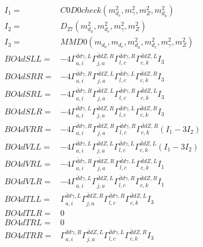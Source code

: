 \documentclass[A4,landscape]{article}
\begin{document}
\begin{align} 
I_1 = & C0D0check(m^2_{d_{{c}}}, m^2_{\gamma}, m^2_{Z}, m^2_{d_{{a}}}) \\ 
I_2 = & D_{27}(m^2_{d_{{a}}}, m^2_{d_{{c}}}, m^2_{\gamma}, m^2_{Z}) \\ 
I_3 = & MMD0(m_{d_{{a}}}, m_{d_{{c}}}, m^2_{d_{{a}}}, m^2_{d_{{c}}}, m^2_{\gamma}, m^2_{Z}) \\ 
  BO4dSLL= & -4  \Gamma^{\bar{d}d \gamma ,L}_{a, i} \Gamma^{\bar{d}d Z ,R}_{j, a} \Gamma^{\bar{d}d \gamma ,R}_{l, c} \Gamma^{\bar{d}d Z ,L}_{c, k} I_3 \\ 
  BO4dSRR= & -4  \Gamma^{\bar{d}d \gamma ,R}_{a, i} \Gamma^{\bar{d}d Z ,L}_{j, a} \Gamma^{\bar{d}d \gamma ,L}_{l, c} \Gamma^{\bar{d}d Z ,R}_{c, k} I_3 \\ 
  BO4dSRL= & -4  \Gamma^{\bar{d}d \gamma ,R}_{a, i} \Gamma^{\bar{d}d Z ,L}_{j, a} \Gamma^{\bar{d}d \gamma ,R}_{l, c} \Gamma^{\bar{d}d Z ,L}_{c, k} I_3 \\ 
  BO4dSLR= & -4  \Gamma^{\bar{d}d \gamma ,L}_{a, i} \Gamma^{\bar{d}d Z ,R}_{j, a} \Gamma^{\bar{d}d \gamma ,L}_{l, c} \Gamma^{\bar{d}d Z ,R}_{c, k} I_3 \\ 
  BO4dVRR= & -4  \Gamma^{\bar{d}d \gamma ,R}_{a, i} \Gamma^{\bar{d}d Z ,R}_{j, a} \Gamma^{\bar{d}d \gamma ,R}_{l, c} \Gamma^{\bar{d}d Z ,R}_{c, k} (I_1 - 3 I_2) \\ 
  BO4dVLL= & -4  \Gamma^{\bar{d}d \gamma ,L}_{a, i} \Gamma^{\bar{d}d Z ,L}_{j, a} \Gamma^{\bar{d}d \gamma ,L}_{l, c} \Gamma^{\bar{d}d Z ,L}_{c, k} (I_1 - 3 I_2) \\ 
  BO4dVRL= & -4  \Gamma^{\bar{d}d \gamma ,R}_{a, i} \Gamma^{\bar{d}d Z ,R}_{j, a} \Gamma^{\bar{d}d \gamma ,L}_{l, c} \Gamma^{\bar{d}d Z ,L}_{c, k} I_1 \\ 
  BO4dVLR= & -4  \Gamma^{\bar{d}d \gamma ,L}_{a, i} \Gamma^{\bar{d}d Z ,L}_{j, a} \Gamma^{\bar{d}d \gamma ,R}_{l, c} \Gamma^{\bar{d}d Z ,R}_{c, k} I_1 \\ 
  BO4dTLL= &  \Gamma^{\bar{d}d \gamma ,L}_{a, i} \Gamma^{\bar{d}d Z ,R}_{j, a} \Gamma^{\bar{d}d \gamma ,R}_{l, c} \Gamma^{\bar{d}d Z ,L}_{c, k} I_3 \\ 
  BO4dTLR= & 0 \\ 
  BO4dTRL= & 0 \\ 
  BO4dTRR= &  \Gamma^{\bar{d}d \gamma ,R}_{a, i} \Gamma^{\bar{d}d Z ,L}_{j, a} \Gamma^{\bar{d}d \gamma ,L}_{l, c} \Gamma^{\bar{d}d Z ,R}_{c, k} I_3 \\ 
\end{align} 
\end{document}
